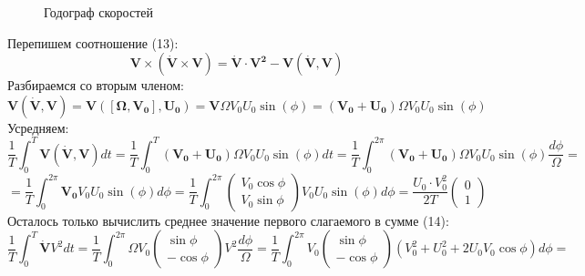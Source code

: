 \documentclass[12pt]{article}
\begin{document}
	\begin{figure}[h!]
		\caption{Годограф скоростей}
	\end{figure}
	Перепишем соотношение (13):
	\begin{equation}
	\mathbf{
	V\times(\dot{V}\times V) = \dot{V}\cdot V^2 - V (\dot{V},V) 	
	}
	\end{equation}
	Разбираемся со вторым членом:
	\[\mathbf{V (\dot{V},V) = V (\left[\Omega,V_0\right],U_0) = V} 
	\Omega V_0 U_0 \sin(\phi) = \mathbf{(V_0 + U_0)} \Omega V_0 U_0 \sin(\phi)
	\]
	Усредняем:
	\[\frac{1}{T}\int_0^T \mathbf{V (\dot{V},V)} dt =  \frac{1}{T}\int_0^T \mathbf{(V_0 + U_0)} \Omega V_0 U_0 \sin(\phi) dt = \frac{1}{T}\int_0^{2\pi} \mathbf{(V_0 + U_0)} \Omega V_0 U_0 \sin(\phi) \frac{d\phi}{\Omega} = \]
	\begin{equation}= \frac{1}{T}\int_0^{2\pi} \mathbf{V_0} V_0 U_0 \sin(\phi) d\phi = \frac{1}{T}\int_0^{2\pi} 
	\begin{pmatrix}
	V_0 \cos \phi \\
	V_0 \sin \phi
	\end{pmatrix}
	 V_0 U_0 \sin(\phi) d\phi = \frac{U_0\cdot V_0^2}{2T}\begin{pmatrix}0\\1\end{pmatrix}\end{equation}
	Осталось только вычислить среднее значение первого слагаемого в сумме (14):
	\[
		\frac{1}{T}\int_0^T \mathbf{\dot{V}} V^2 dt = \frac{1}{T}\int_0^{2\pi} \Omega V_0 \begin{pmatrix}\sin\phi \\ -\cos\phi\end{pmatrix} V^2 \frac{d\phi}{\Omega} = \frac{1}{T}\int_0^{2\pi} V_0 \begin{pmatrix}\sin\phi \\ -\cos\phi\end{pmatrix} (V_0^2+U_0^2 + 2U_0V_0\cos\phi) d\phi = 
	\]
\end{document}
